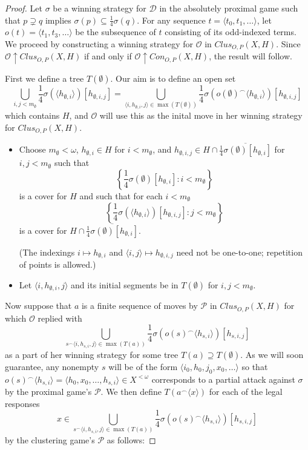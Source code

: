 \documentclass{amsart}
\theoremstyle{definition}
\theoremstyle{remark}
\newcommand{\<}{\langle}
\renewcommand{\>}{\rangle}
\newcommand{\cl}[1]{\overline{#1}}
\newcommand{\congame}[2]{Con_{O,P}(#1,#2)}
\newcommand{\clusgame}[2]{Clus_{O,P}(#1,#2)}
\newcommand{\pl}[1]{\mathscr{#1}}
\newcommand{\win}{\uparrow}
\newcommand{\concat}{^\frown}
\begin{document}
\begin{proof}
  Let $\sigma$ be a winning strategy for $\pl D$ in the absolutely proximal 
  game such that $p\supsetneq q$ implies $\sigma(p)\subseteq \frac{1}{4}\sigma(q)$.
  For any sequence $t=\<t_0,t_1,\dots\>$, let $o(t)=\<t_1,t_3,\dots\>$ 
  be the subsequence of $t$ 
  consisting of its odd-indexed terms. We proceed by constructing a winning
  strategy for $\pl O$ in $\clusgame{X}{H}$. Since $\pl O\win\clusgame{X}{H}$ 
  if and only if $\pl O\win\congame{X}{H}$, the result will follow.

  \bigskip

First we define a tree $T(\emptyset)$. Our aim is to define an open set
  \[
    \bigcup_{i,j<m_\emptyset}
      \frac{1}{4}\sigma(\<h_{\emptyset,i}\>)[h_{\emptyset,i,j}]
    =
    \bigcup_{\<i,h_{\emptyset,i},j\>\in\max(T(\emptyset))} 
      \frac{1}{4}\sigma(o(\emptyset)\concat\<h_{\emptyset,i}\>)[h_{\emptyset,i,j}]
  \]
which contains $H$, and $\pl O$ will use this as the inital move in her winning 
strategy for $\clusgame{X}{H}$.

  \begin{itemize}
    \item Choose $m_\emptyset<\omega$, $h_{\emptyset,i}\in H$ for $i<m_\emptyset$, and $h_{\emptyset,i,j}\in H\cap\cl{\frac{1}{4}\sigma(\emptyset)[h_{\emptyset,i}]}$ for $i,j<m_\emptyset$ such that
      \[
        \left\{\frac{1}{4}\sigma(\emptyset)[h_{\emptyset,i}]:i<m_\emptyset\right\}
      \]
    is a cover for $H$ and such that for each $i<m_\emptyset$
      \[
        \left\{\frac{1}{4}\sigma(\<h_{\emptyset,i}\>)[h_{\emptyset,i,j}]:j<m_\emptyset\right\}
      \]
    is a cover for $H\cap\cl{\frac{1}{4}\sigma(\emptyset)[h_{\emptyset,i}]}$.

    (The indexings $i\mapsto h_{\emptyset,i}$ and 
    $\<i,j\>\mapsto h_{\emptyset,i, j}$ need not be 
    one-to-one; repetition of points is allowed.)
    \item Let $\<i,h_{\emptyset,i},j\>$ and its initial segments be in 
    $T(\emptyset)$ for $i,j<m_\emptyset$.
  \end{itemize}



\bigskip

Now suppose that $a$ is a finite 
sequence of moves by $\pl P$ in $\clusgame{X}{H}$ for which $\pl O$ replied with
  \[
    \bigcup_{s\concat\<i,h_{s,i},j\>\in\max(T(a))} 
      \frac{1}{4}\sigma(o(s)\concat\<h_{s,i}\>)[h_{s,i,j}]
  \]
as a part of her winning strategy for some tree $T(a)\supseteq T(\emptyset)$. 
As we will soon guarantee, any nonempty $s$ will be of the form 
$\<i_0,h_0,j_0,x_0,\dots\>$ so that 
$o(s)\concat\<h_{s,i}\> = \<h_0,x_0,\dots,h_{s,i}\>\in X^{<\omega}$ 
corresponds to a partial attack against $\sigma$ by the proximal game's $\pl P$. 
We then define $T(a\concat\<x\>)$ for each of the legal responses
  \[
    x\in 
      \bigcup_{s\concat\<i,h_{s,i},j\>\in\max(T(a))} 
      \frac{1}{4}\sigma(o(s)\concat\<h_{s,i}\>)[h_{s,i,j}]
  \]
by the clustering game's $\pl P$ as follows:


\end{proof}
\end{document}
